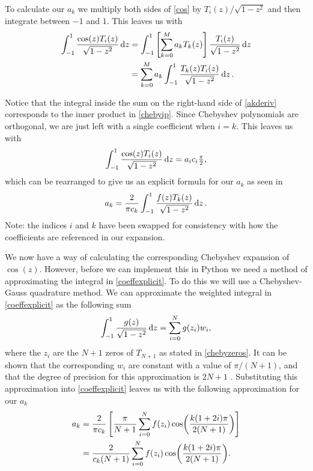 To calculate our $ a_k $ we multiply both sides of \eqref{cos} by $ T_i(z) / \sqrt{1 - z^2}$ and then integrate between $ -1 $ and $ 1 $. This leaves us with
\begin{align}
    \int^{1}_{-1} \frac{\cos(z) T_i(z)}{\sqrt{1-z^2}} \dd{z} &= \int^{1}_{-1} \left[\sum^M_{k=0} a_k T_k(z)\right] \frac{T_i(z)}{\sqrt{1-z^2}} \dd{z} \\
    &= \sum^M_{k=0} a_k \int^{1}_{-1} \frac{T_k(z) T_i (z)}{\sqrt{1 - z^2}} \dd{z}.
    \label{akderiv}
\end{align}

Notice that the integral inside the sum on the right-hand side of \eqref{akderiv} corresponds to the inner product in \eqref{chebyip}. Since Chebyshev polynomials are orthogonal, we are just left with a single coefficient when $ i = k $. This leaves us with
\begin{equation}
    \int^{1}_{-1} \frac{\cos(z) T_i(z)}{\sqrt{1-z^2}} \dd{z} = a_i c_i \tfrac{\pi}{2},
\end{equation}
which can be rearranged to give us an explicit formula for our $ a_k $ as seen in \citet{canuto2007spectral} 
\begin{equation}
    a_k = \frac{2}{\pi c_k} \int^{1}_{-1} \frac{f(z) T_k(z)}{\sqrt{1-z^2}} \dd{z}.
\label{coeffexplicit}
\end{equation}
Note: the indices $ i $ and $ k $ have been swapped for consistency with how the coefficients are referenced in our expansion.

We now have a way of calculating the corresponding Chebyshev expansion of $ \cos(z)$. However, before we can implement this in Python we need a method of approximating the integral in \eqref{coeffexplicit}. To do this we will use a Chebyshev-Gauss quadrature method. We can approximate the weighted integral in \eqref{coeffexplicit} as the following sum
\begin{equation}
    \int^{1}_{-1} \frac{g(z)}{\sqrt{1-z^2}} \dd{z} = \sum^N_{i=0} g(z_i) w_i,
\end{equation}
where the $ z_i $ are the $ N + 1 $ zeros of $ T_{N+1}$ as stated in \eqref{chebyzeros}. It can be shown that the corresponding $ w_i $ are constant with a value of $ \pi / (N+1)$, and that the degree of precision for this approximation is $ 2N + 1 $ \citep{canuto2007spectral}. Substituting this approximation into \eqref{coeffexplicit} leaves us with the following approximation for our $ a_k$
\begin{align}
    a_k &= \frac{2}{\pi c_k} \left[ \frac{\pi}{N+1} \sum^N_{i=0} f(z_i) \cos(\frac{k (1 + 2i) \pi}{2 (N + 1)})\right] \\
    &= \frac{2}{c_k (N+1)} \sum^N_{i=0} f(z_i) \cos(\frac{k (1 + 2i) \pi}{2 (N + 1)}). 
\end{align}

